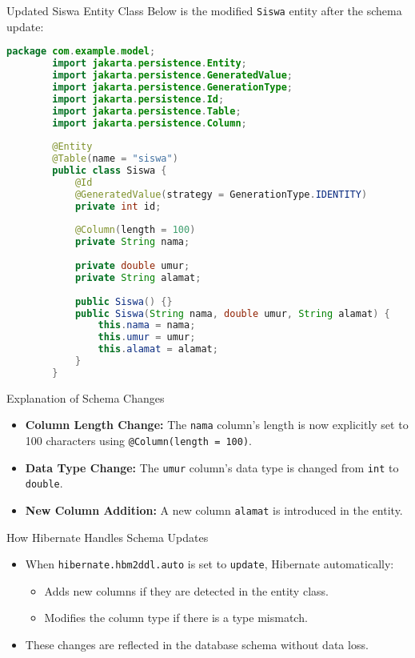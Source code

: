 \documentclass[aspectratio=169, table]{beamer}
\begin{document}
\begin{frame}[fragile]{Updated Siswa Entity Class}
	\vspace{20pt}
	Below is the modified \texttt{Siswa} entity after the schema update:
	
	\begin{lstlisting}[language=Java, style=JavaStyle]
		package com.example.model;
		import jakarta.persistence.Entity;
		import jakarta.persistence.GeneratedValue;
		import jakarta.persistence.GenerationType;
		import jakarta.persistence.Id;
		import jakarta.persistence.Table;
		import jakarta.persistence.Column;
		
		@Entity
		@Table(name = "siswa")
		public class Siswa {
			@Id
			@GeneratedValue(strategy = GenerationType.IDENTITY)
			private int id;
			
			@Column(length = 100)
			private String nama;
			
			private double umur;
			private String alamat;
			
			public Siswa() {}
			public Siswa(String nama, double umur, String alamat) {
				this.nama = nama;
				this.umur = umur;
				this.alamat = alamat;
			}
		}
	\end{lstlisting}
\end{frame}

\begin{frame}{Explanation of Schema Changes}
	\vspace{20pt}
	\begin{itemize}
		\item \textbf{Column Length Change:} The \texttt{nama} column's length is now explicitly set to 100 characters using \texttt{@Column(length = 100)}.
		\item \textbf{Data Type Change:} The \texttt{umur} column's data type is changed from \texttt{int} to \texttt{double}.
		\item \textbf{New Column Addition:} A new column \texttt{alamat} is introduced in the entity.
	\end{itemize}
\end{frame}

\begin{frame}{How Hibernate Handles Schema Updates}
	\vspace{20pt}
	\begin{itemize}
		\item When \texttt{hibernate.hbm2ddl.auto} is set to \texttt{update}, Hibernate automatically:
		\begin{itemize}
			\item Adds new columns if they are detected in the entity class.
			\item Modifies the column type if there is a type mismatch.
		\end{itemize}
		\item These changes are reflected in the database schema without data loss.
	\end{itemize}
\end{frame}
\end{document}
